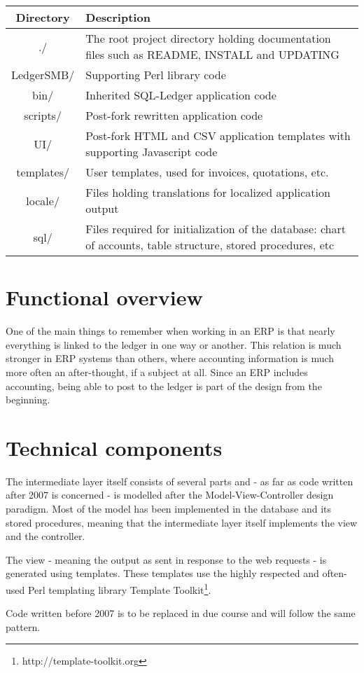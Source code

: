 \begin{tabular}{|c|p{9cm}|}
\hline Directory &  Description \\
\hline
./ & The root project directory holding documentation files such as
  README, INSTALL and UPDATING  \\ 
LedgerSMB/ & Supporting Perl library code \\
bin/ & Inherited SQL-Ledger application code \\
scripts/ & Post-fork rewritten application code \\
UI/ & Post-fork HTML and CSV application templates with supporting Javascript code \\
templates/ & User templates, used for invoices, quotations, etc. \\
locale/ & Files holding translations for localized application output \\
sql/ & Files required for initialization of the database: chart of accounts,
 table structure, stored procedures, etc \\
\hline 
\end{tabular} 


\section{Functional overview}

One of the main things to remember when working in an ERP is that nearly everything is
linked to the ledger in one way or another.  This relation is much stronger in ERP
systems than others, where accounting information is much more often an after-thought,
if a subject at all.  Since an ERP includes accounting, being able to post to the
ledger is part of the design from the beginning.





\section{Technical components}

The intermediate layer itself consists of several parts and - as far as code written
after 2007 is concerned - is modelled after the Model-View-Controller design paradigm.
Most of the model has been implemented in the database and its stored procedures, meaning
that the intermediate layer itself implements the view and the controller.

The view - meaning the output as sent in response to the web requests - is generated
using templates.  These templates use the highly respected and often-used Perl templating
library Template Toolkit\footnote{http://template-toolkit.org}.

Code written before 2007 is to be replaced in due course and will follow the same
pattern.


